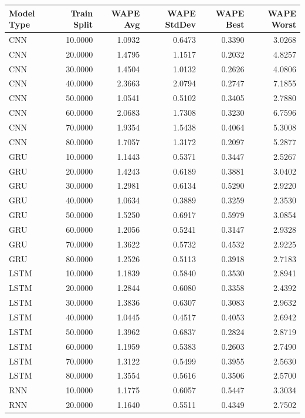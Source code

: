 \begin{tabular}{lrrrrr}
\toprule
Model Type & Train Split & WAPE Avg & WAPE StdDev & WAPE Best & WAPE Worst \\
\midrule
CNN & 10.0000 & 1.0932 & 0.6473 & 0.3390 & 3.0268 \\
CNN & 20.0000 & 1.4795 & 1.1517 & 0.2032 & 4.8257 \\
CNN & 30.0000 & 1.4504 & 1.0132 & 0.2626 & 4.0806 \\
CNN & 40.0000 & 2.3663 & 2.0794 & 0.2747 & 7.1855 \\
CNN & 50.0000 & 1.0541 & 0.5102 & 0.3405 & 2.7880 \\
CNN & 60.0000 & 2.0683 & 1.7308 & 0.3230 & 6.7596 \\
CNN & 70.0000 & 1.9354 & 1.5438 & 0.4064 & 5.3008 \\
CNN & 80.0000 & 1.7057 & 1.3172 & 0.2097 & 5.2877 \\
GRU & 10.0000 & 1.1443 & 0.5371 & 0.3447 & 2.5267 \\
GRU & 20.0000 & 1.4243 & 0.6189 & 0.3881 & 3.0402 \\
GRU & 30.0000 & 1.2981 & 0.6134 & 0.5290 & 2.9220 \\
GRU & 40.0000 & 1.0634 & 0.3889 & 0.3259 & 2.3530 \\
GRU & 50.0000 & 1.5250 & 0.6917 & 0.5979 & 3.0854 \\
GRU & 60.0000 & 1.2056 & 0.5241 & 0.3147 & 2.9328 \\
GRU & 70.0000 & 1.3622 & 0.5732 & 0.4532 & 2.9225 \\
GRU & 80.0000 & 1.2526 & 0.5113 & 0.3918 & 2.7183 \\
LSTM & 10.0000 & 1.1839 & 0.5840 & 0.3530 & 2.8941 \\
LSTM & 20.0000 & 1.2844 & 0.6080 & 0.3358 & 2.4392 \\
LSTM & 30.0000 & 1.3836 & 0.6307 & 0.3083 & 2.9632 \\
LSTM & 40.0000 & 1.0445 & 0.4517 & 0.4053 & 2.6942 \\
LSTM & 50.0000 & 1.3962 & 0.6837 & 0.2824 & 2.8719 \\
LSTM & 60.0000 & 1.1959 & 0.5383 & 0.2603 & 2.7490 \\
LSTM & 70.0000 & 1.3122 & 0.5499 & 0.3955 & 2.5630 \\
LSTM & 80.0000 & 1.3554 & 0.5616 & 0.3506 & 2.5700 \\
RNN & 10.0000 & 1.1775 & 0.6057 & 0.5447 & 3.3034 \\
RNN & 20.0000 & 1.1640 & 0.5511 & 0.4349 & 2.7502 \\

\end{tabular}
